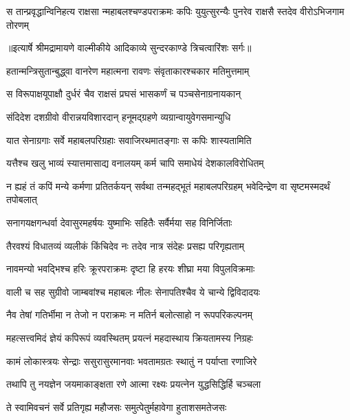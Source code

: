 \fourlineindentedshloka
{स तान्प्रवृद्धान्विनिहत्य राक्षसा}
{न्महाबलश्चण्डपराक्रमः कपिः}
{युयुत्सुरन्यैः पुनरेव राक्षसै}
{स्तदेव वीरोऽभिजगाम तोरणम्} %


{॥इत्यार्षे श्रीमद्रामायणे वाल्मीकीये आदिकाव्ये सुन्दरकाण्डे त्रिचत्वारिंशः सर्गः॥}


\twolineshloka
{हतान्मन्त्रिसुतान्बुद्ध्वा वानरेण महात्मना}
{रावणः संवृताकारश्चकार मतिमुत्तमाम्} %

\twolineshloka
{स विरूपाक्षयूपाक्षौ दुर्धरं चैव राक्षसं}
{प्रघसं भासकर्णं च पञ्चसेनाग्रनायकान्} %

\twolineshloka
{संदिदेश दशग्रीवो वीरान्नयविशारदान्}
{हनूमद्ग्रहणे व्यग्रान्वायुवेगसमान्युधि} %

\twolineshloka
{यात सेनाग्रगाः सर्वे महाबलपरिग्रहाः}
{सवाजिरथमातङ्गाः स कपिः शास्यतामिति} %

\twolineshloka
{यत्तैश्च खलु भाव्यं स्यात्तमासाद्य वनालयम्}
{कर्म चापि समाधेयं देशकालविरोधितम्} %

\threelineshloka
{न ह्यहं तं कपिं मन्ये कर्मणा प्रतितर्कयन्}
{सर्वथा तन्महद्भूतं महाबलपरिग्रहम्}
{भवेदिन्द्रेण वा सृष्टमस्मदर्थं तपोबलात्} %

\twolineshloka
{सनागयक्षगन्धर्वा देवासुरमहर्षयः}
{युष्माभिः सहितैः सर्वैर्मया सह विनिर्जिताः} %

\twolineshloka
{तैरवश्यं विधातव्यं व्यलीकं किंचिदेव नः}
{तदेव नात्र संदेहः प्रसह्य परिगृह्यताम्} %

\twolineshloka
{नावमन्यो भवद्भिश्च हरिः क्रूरपराक्रमः}
{दृष्टा हि हरयः शीघ्रा मया विपुलविक्रमाः} %

\twolineshloka
{वाली च सह सुग्रीवो जाम्बवांश्च महाबलः}
{नीलः सेनापतिश्चैव ये चान्ये द्विविदादयः} %

\twolineshloka
{नैव तेषां गतिर्भीमा न तेजो न पराक्रमः}
{न मतिर्न बलोत्साहो न रूपपरिकल्पनम्} %

\twolineshloka
{महत्सत्त्वमिदं ज्ञेयं कपिरूपं व्यवस्थितम्}
{प्रयत्नं महदास्थाय क्रियतामस्य निग्रहः} %

\twolineshloka
{कामं लोकास्त्रयः सेन्द्राः ससुरासुरमानवाः}
{भवतामग्रतः स्थातुं न पर्याप्ता रणाजिरे} %

\twolineshloka
{तथापि तु नयज्ञेन जयमाकाङ्क्षता रणे}
{आत्मा रक्ष्यः प्रयत्नेन युद्धसिद्धिर्हि चञ्चला} %

\twolineshloka
{ते स्वामिवचनं सर्वे प्रतिगृह्य महौजसः}
{समुत्पेतुर्महावेगा हुताशसमतेजसः} %

